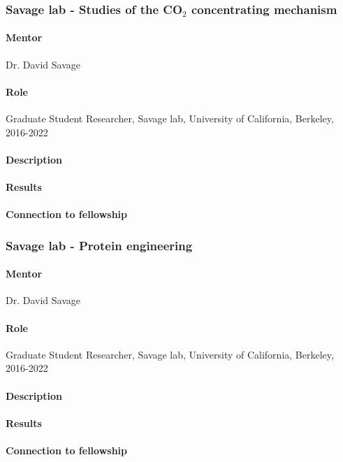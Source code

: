 \documentclass[11pt]{article}
\begin{document}
\subsubsection{Savage lab - Studies of the CO$_2$ concentrating mechanism}
\begin{refsection}
%
\paragraph{Mentor}
Dr. David Savage
%
\paragraph{Role}
Graduate Student Researcher, Savage lab, University of California, Berkeley, 2016-2022
%
\paragraph{Description}
%
\paragraph{Results}
%
\paragraph{Connection to fellowship}
%
\nocite{Desmarais2019-dc,Flamholz2022-yo}
\printbibliography[heading=none]
\end{refsection}
%
\subsubsection{Savage lab - Protein engineering}
%
\paragraph{Mentor}
Dr. David Savage
%
\paragraph{Role}
Graduate Student Researcher, Savage lab, University of California, Berkeley, 2016-2022
%
\paragraph{Description}
%
\paragraph{Results}
%
\paragraph{Connection to fellowship}
%
\end{document}
